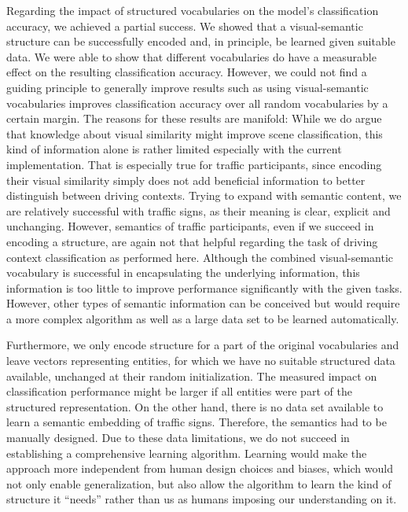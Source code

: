 Regarding the impact of structured vocabularies on the model's classification accuracy, we achieved a partial success.
We showed that a visual-semantic structure can be successfully encoded and, in principle, be learned given suitable data.
We were able to show that different vocabularies do have a measurable effect on the resulting classification accuracy.
However, we could not find a guiding principle to generally improve results such as using visual-semantic vocabularies improves classification accuracy over all random vocabularies by a certain margin.
The reasons for these results are manifold:
While we do argue that knowledge about visual similarity might improve scene classification, this kind of information alone is rather limited especially with the current implementation.
That is especially true for traffic participants, since encoding their visual similarity simply does not add beneficial information to better distinguish between driving contexts.
Trying to expand with semantic content, we are relatively successful with traffic signs, as their meaning is clear, explicit and unchanging.
However, semantics of traffic participants, even if we succeed in encoding a structure, are again not that helpful regarding the task of driving context classification as performed here.
Although the combined visual-semantic vocabulary is successful in encapsulating the underlying information, this information is too little to improve performance significantly with the given tasks.
However, other types of semantic information can be conceived but would require a more complex algorithm as well as a large data  set to be learned automatically.

Furthermore, we only encode structure for a part of the original vocabularies and leave vectors representing entities, for which we have no suitable structured data available, unchanged at their random initialization.
The measured impact on classification performance might be larger if all entities were part of the structured representation.
On the other hand, there is no data set available to learn a semantic embedding of traffic signs.
Therefore, the semantics had to be manually designed.
Due to these data limitations, we do not succeed in establishing a comprehensive learning algorithm.
Learning would make the approach more independent from human design choices and biases, which would not only enable generalization, but also allow the algorithm to learn the kind of structure it \enquote{needs} rather than us as humans imposing our understanding on it.


